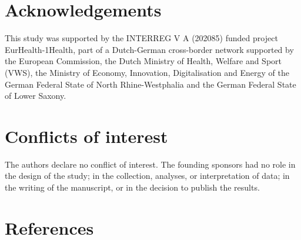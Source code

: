 \documentclass[
]{book}
\begin{document}
\hypertarget{acknowledgements-3}{%
\section{Acknowledgements}\label{acknowledgements-3}}

This study was supported by the INTERREG V A (202085) funded project EurHealth-1Health, part of a Dutch-German cross-border network supported by the European Commission, the Dutch Ministry of Health, Welfare and Sport (VWS), the Ministry of Economy, Innovation, Digitalisation and Energy of the German Federal State of North Rhine-Westphalia and the German Federal State of Lower Saxony.

\hypertarget{conflicts-of-interest}{%
\section{Conflicts of interest}\label{conflicts-of-interest}}

The authors declare no conflict of interest. The founding sponsors had no role in the design of the study; in the collection, analyses, or interpretation of data; in the writing of the manuscript, or in the decision to publish the results.

\hypertarget{references-7}{%
\section*{References}\label{references-7}}
\end{document}
